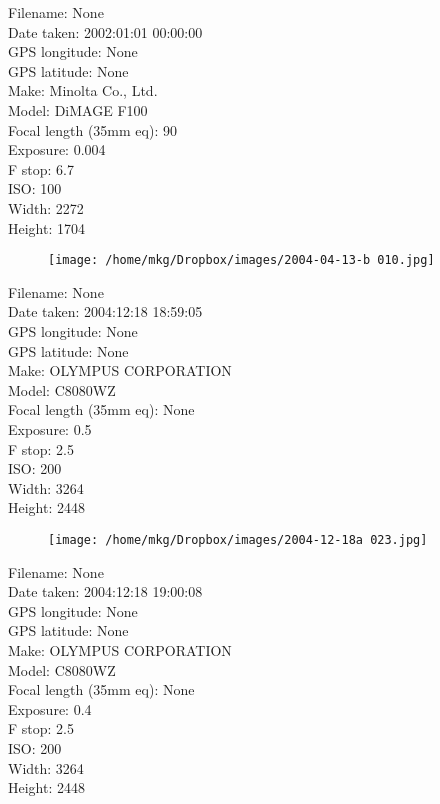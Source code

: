 \clearpage
\recalctypearea
\newpage
\noindent
Filename: None\\ 
Date taken: 2002:01:01 00:00:00\\ 
GPS longitude: None\\ 
GPS latitude: None\\ 
Make: Minolta Co., Ltd.\\ 
Model: DiMAGE F100\\ 
Focal length (35mm eq): 90\\ 
Exposure: 0.004\\ 
F stop: 6.7\\ 
ISO: 100\\ 
Width: 2272\\ 
Height: 1704\\ 

\clearpage
\recalctypearea
\newpage
\noindent
\begin{figure}
    \texttt{[image: /home/mkg/Dropbox/images/2004-04-13-b 010.jpg]}
    \captionlistentry[figure]{\url{\protect\detokenize{}}}
\end{figure}

\clearpage
\recalctypearea
\newpage
\noindent
Filename: None\\ 
Date taken: 2004:12:18 18:59:05\\ 
GPS longitude: None\\ 
GPS latitude: None\\ 
Make: OLYMPUS CORPORATION\\ 
Model: C8080WZ\\ 
Focal length (35mm eq): None\\ 
Exposure: 0.5\\ 
F stop: 2.5\\ 
ISO: 200\\ 
Width: 3264\\ 
Height: 2448\\ 

\clearpage
\recalctypearea
\newpage
\noindent
\begin{figure}
    \texttt{[image: /home/mkg/Dropbox/images/2004-12-18a 023.jpg]}
    \captionlistentry[figure]{\url{\protect\detokenize{}}}
\end{figure}

\clearpage
\recalctypearea
\newpage
\noindent
Filename: None\\ 
Date taken: 2004:12:18 19:00:08\\ 
GPS longitude: None\\ 
GPS latitude: None\\ 
Make: OLYMPUS CORPORATION\\ 
Model: C8080WZ\\ 
Focal length (35mm eq): None\\ 
Exposure: 0.4\\ 
F stop: 2.5\\ 
ISO: 200\\ 
Width: 3264\\ 
Height: 2448\\ 

